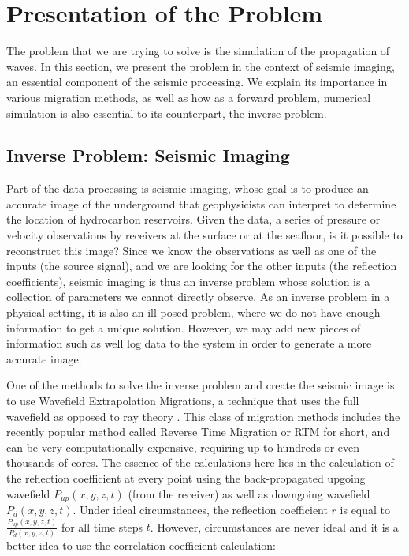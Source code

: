 \newpage
\section{Presentation of the Problem}

The problem that we are trying to solve is the simulation of the propagation of waves. In this section, we present the problem in the context of seismic imaging, an essential component of the seismic processing. We explain its importance in various migration methods, as well as how as a forward problem, numerical simulation is also essential to its counterpart, the inverse problem.

\subsection{Inverse Problem: Seismic Imaging}

Part of the data processing is seismic imaging, whose goal is to produce an accurate image of the underground that geophysicists can interpret to determine the location of hydrocarbon reservoirs. Given the data, a series of pressure or velocity observations by receivers at the surface or at the seafloor, is it possible to reconstruct this image? Since we know the observations as well as one of the inputs (the source signal), and we are looking for the other inputs (the reflection coefficients), seismic imaging is thus an inverse problem whose solution is a collection of parameters we cannot directly observe. As an inverse problem in a physical setting, it is also an ill-posed problem, where we do not have enough information to get a unique solution. However, we may add new pieces of information such as well log data to the system in order to generate a more accurate image. 


One of the methods to solve the inverse problem and create the seismic image is to use Wavefield Extrapolation Migrations, a technique that uses the full wavefield as opposed to ray theory \cite{EAGE}. This class of migration methods includes the recently popular method called Reverse Time Migration or RTM for short, and can be very computationally expensive, requiring up to hundreds or even thousands of cores. The essence of the calculations here lies in the calculation of the reflection coefficient at every point using the back-propagated upgoing wavefield $P_{up}(x,y,z,t)$ (from the receiver) as well as downgoing wavefield $P_{d}(x,y,z,t)$. Under ideal circumstances, the reflection coefficient $r$ is equal to $\frac{P_{up}(x,y,z,t)}{P_d(x,y,z,t)}$ for all time steps $t$. However, circumstances are never ideal and it is a better idea to use the correlation coefficient calculation:

